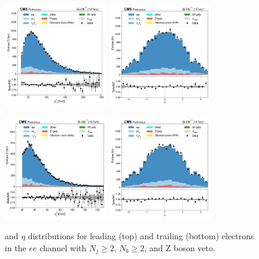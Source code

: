\begin{figure}[htb!]
    \centering
    \includegraphics[width=0.4\textwidth]{chapters/Appendix/sectionPlots/figures/data_mc_overlays/ee_2016_cat_gt2_gt2_b_signal_linear_lepton_lepton1_pt}
    \includegraphics[width=0.4\textwidth]{chapters/Appendix/sectionPlots/figures/data_mc_overlays/ee_2016_cat_gt2_gt2_b_signal_linear_lepton_lepton1_eta}

    \includegraphics[width=0.4\textwidth]{chapters/Appendix/sectionPlots/figures/data_mc_overlays/ee_2016_cat_gt2_gt2_b_signal_linear_lepton_lepton2_pt}
    \includegraphics[width=0.4\textwidth]{chapters/Appendix/sectionPlots/figures/data_mc_overlays/ee_2016_cat_gt2_gt2_b_signal_linear_lepton_lepton2_eta}
    \caption{\pt and $\eta$ distributions for leading (top) and trailing
    (bottom) electrons in the $ee$ channel with $N_{j} \geq 2$, $N_{b}
    \geq 2$, and Z boson veto.}
    \label{fig:ee_2_kinematic}
\end{figure}

